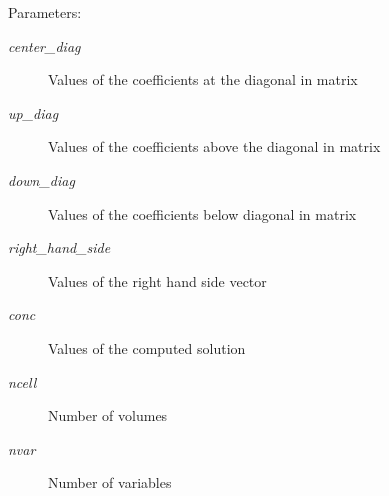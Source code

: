 \begin{Desc}
\item[Parameters:]
\begin{description}
\item[{\em center\_\-diag}]Values of the coefficients at the diagonal in matrix\item[{\em up\_\-diag}]Values of the coefficients above the diagonal in matrix\item[{\em down\_\-diag}]Values of the coefficients below diagonal in matrix\item[{\em right\_\-hand\_\-side}]Values of the right hand side vector\item[{\em conc}]Values of the computed solution\item[{\em ncell}]Number of volumes\item[{\em nvar}]Number of variables \end{description}
\end{Desc}
